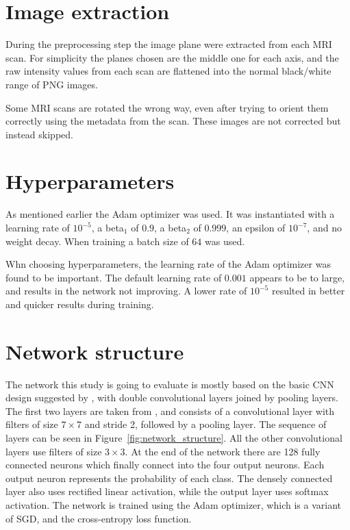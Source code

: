 \documentclass{kththesis}
\begin{document}
\begin{minipage}{.7\linewidth}
\vspace*{-50mm}
\section{Image extraction} \label{image_extraction}
During the preprocessing step the image plane were extracted from each MRI scan. For simplicity the planes chosen are the middle one for each axis, and the raw intensity values from each scan are flattened into the normal black/white range of PNG images.

Some MRI scans are rotated the wrong way, even after trying to orient them correctly using the metadata from the scan. These images are not corrected but instead skipped.

\section{Hyperparameters}
As mentioned earlier the Adam optimizer was used. It was instantiated with a learning rate of $10^{-5}$, a beta$_1$ of $0.9$, a beta$_2$ of $0.999$, an epsilon of $10^{-7}$, and no weight decay. When training a batch size of $64$ was used.

Whn choosing hyperparameters, the learning rate of the Adam optimizer was found to be important. The default learning rate of $0.001$ appears to be to large, and results in the network not improving. A lower rate of $10^{-5}$ resulted in better and quicker results during training.

\section{Network structure} \label{network_structure}
The network this study is going to evaluate is mostly based on the basic CNN design suggested by \textcite{cnnIntro}, with double convolutional layers joined by pooling layers. The first two layers are taken from \textcite{islam2018early}, and consists of a convolutional layer with filters of size $7 \times 7$ and stride 2, followed by a pooling layer. The sequence of layers can be seen in Figure~\ref{fig:network_structure}. All the other convolutional layers use filters of size $3 \times 3$. At the end of the network there are 128 fully connected neurons which finally connect into the four output neurons. Each output neuron represents the probability of each class. The densely connected layer also uses rectified linear activation, while the output layer uses softmax activation. The network is trained using the Adam optimizer, which is a variant of SGD, and the cross-entropy loss function.

\end{minipage}
\end{document}

